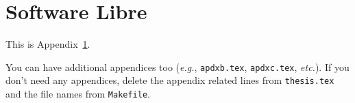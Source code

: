 \appendix

\chapter{Software Libre}
\label{apdx:somelabel}
This is Appendix~\ref{apdx:somelabel}.

You can have additional appendices too
(\emph{e.g.}, \texttt{apdxb.tex}, \texttt{apdxc.tex}, \emph{etc.}).
If you don't need any appendices, delete the appendix
related lines from \texttt{thesis.tex} and the file names
from \texttt{Makefile}.
